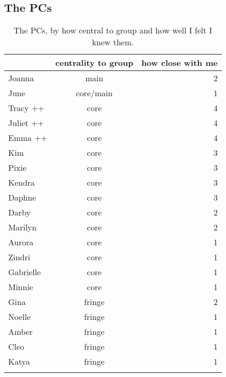\pagebreak

\subsection {The PCs}
\nopagebreak
\begin{table}[ht]
\caption{The PCs, by how central to group and how well I felt I knew them.}\label{PCnames}
	\centering
		\begin{tabular}{lcr} \\
		\lsptoprule
		
			\multirow{2}{*}{\sc name} & \multicolumn{1}{p{2cm}}{\centering \sc centrality to group} & \multicolumn{1}{p{1.75cm}}{\centering \sc how close with me}  \\
			\midrule
			
			Joanna		&		main		&		2  \\
			June			&		core/main &  1 \\
			Tracy ++			&		core		&		4 \\
			Juliet ++	&   core		&		4 \\
			Emma ++		&		core		&		4 \\
			Kim				&		core		&		3 \\
			Pixie			&		core		&		3 \\
			Kendra		&		core		&		3 \\
			Daphne		&		core		&		3 \\
			Darby   	&		core		&		2 \\
			Marilyn 	&		core		&		2 \\
			Aurora		&		core		&		1 \\
			Zindri		&		core		&		1 \\
			Gabrielle	&		core		&		1 \\
			Minnie		&		core		&		1 \\
			Gina			&		fringe	&		2 \\
			Noelle		&		fringe	&		1 \\
			Amber   	&   fringe	&		1 \\
			Cleo			&		fringe	&		1 \\
			Katya			&		fringe	&		1 \\	
			
			   \lspbottomrule
		\end{tabular}
\end{table}


\pagebreak

